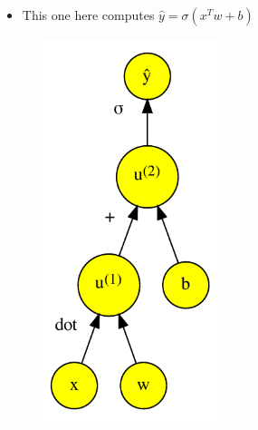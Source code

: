 \documentclass[t]{beamer} %
\begin{document}
\begin{frame}
    \begin{figure}
        \centering
        \begin{minipage}{0.45\textwidth}
            \begin{itemize}[<+->]
                \item This one here computes \(\hat{y} = \sigma (x^T w + b)\)
            \end{itemize}
        \end{minipage}\hfill
        \begin{minipage}{0.45\textwidth}
            \centering
            \begin{figure}[]
                \includegraphics[width=0.6\textwidth]{../plots/computational-graph-b-crop.pdf}
            \end{figure}
        \end{minipage}
    \end{figure}
\end{frame}
\end{document}
